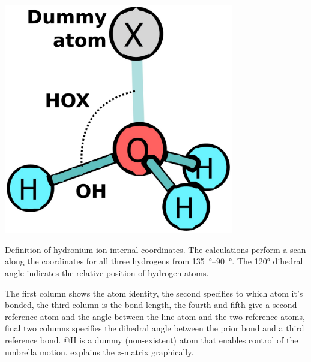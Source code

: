 \begin{marginfigure}[-12\baselineskip]
  \centering
  \includegraphics[width=0.75\textwidth]{pics/zmat.png}
  \caption{Definition of hydronium ion internal coordinates. 
    The calculations perform a scan along the  coordinates for all three hydrogens from \SIrange{135}{90}{\degree}. 
    The \ang{120} dihedral angle indicates the relative position of hydrogen atoms.}
  \label{fig:internal_coords}
\end{marginfigure}
The first column shows the atom identity, the second specifies to which atom it's bonded, the third column is the bond length, the fourth and fifth give a second reference atom and the angle between the line atom and the two reference atoms, final two columns specifies the dihedral angle between the prior bond and a third reference bond. 
\makeatletter @H \makeatother is a dummy (non-existent) atom that enables control of the umbrella motion. 
 explains the \( z \)-matrix graphically. 


